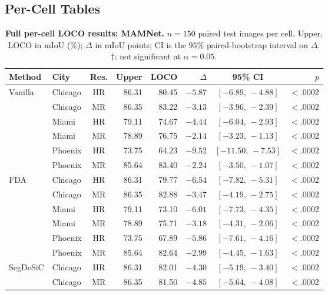 \subsection{Per-Cell Tables}

\begin{table}[h]
\centering
\footnotesize
\setlength{\tabcolsep}{4pt}
\caption{
\textbf{Full per-cell LOCO results: MAMNet.}
$n = 150$ paired test images per cell. Upper, LOCO in mIoU (\%); $\Delta$ in
mIoU points; CI is the $95\%$ paired-bootstrap interval on $\Delta$.
$\dagger$: not significant at $\alpha = 0.05$.
}
\label{tab:loco-full-mamnet}
\begin{tabular}{@{}llcrrrcr@{}}
\toprule
\textbf{Method} & \textbf{City} & \textbf{Res.} & \textbf{Upper} & \textbf{LOCO} & $\Delta$ & \textbf{95\% CI} & $p$ \\
\midrule
Vanilla   & Chicago & HR & 86.31 & 80.45 & $-5.87$  & $[-6.89,\,-4.88]$   & $<\!.0002$ \\
          & Chicago & MR & 86.35 & 83.22 & $-3.13$  & $[-3.96,\,-2.39]$   & $<\!.0002$ \\
          & Miami   & HR & 79.11 & 74.67 & $-4.44$  & $[-6.04,\,-2.93]$   & $<\!.0002$ \\
          & Miami   & MR & 78.89 & 76.75 & $-2.14$  & $[-3.23,\,-1.13]$   & $<\!.0002$ \\
          & Phoenix & HR & 73.75 & 64.23 & $-9.52$  & $[-11.50,\,-7.53]$  & $<\!.0002$ \\
          & Phoenix & MR & 85.64 & 83.40 & $-2.24$  & $[-3.50,\,-1.07]$   & $<\!.0002$ \\
\cmidrule(l){1-8}
FDA       & Chicago & HR & 86.31 & 79.77 & $-6.54$  & $[-7.82,\,-5.31]$   & $<\!.0002$ \\
          & Chicago & MR & 86.35 & 82.88 & $-3.47$  & $[-4.19,\,-2.75]$   & $<\!.0002$ \\
          & Miami   & HR & 79.11 & 73.10 & $-6.01$  & $[-7.73,\,-4.35]$   & $<\!.0002$ \\
          & Miami   & MR & 78.89 & 75.71 & $-3.18$  & $[-4.31,\,-2.06]$   & $<\!.0002$ \\
          & Phoenix & HR & 73.75 & 67.89 & $-5.86$  & $[-7.61,\,-4.16]$   & $<\!.0002$ \\
          & Phoenix & MR & 85.64 & 82.64 & $-2.99$  & $[-4.45,\,-1.63]$   & $<\!.0002$ \\
\cmidrule(l){1-8}
SegDeSiC  & Chicago & HR & 86.31 & 82.01 & $-4.30$  & $[-5.19,\,-3.40]$   & $<\!.0002$ \\
          & Chicago & MR & 86.35 & 81.50 & $-4.85$  & $[-5.64,\,-4.08]$   & $<\!.0002$ \\

\end{tabular}
\end{table}
